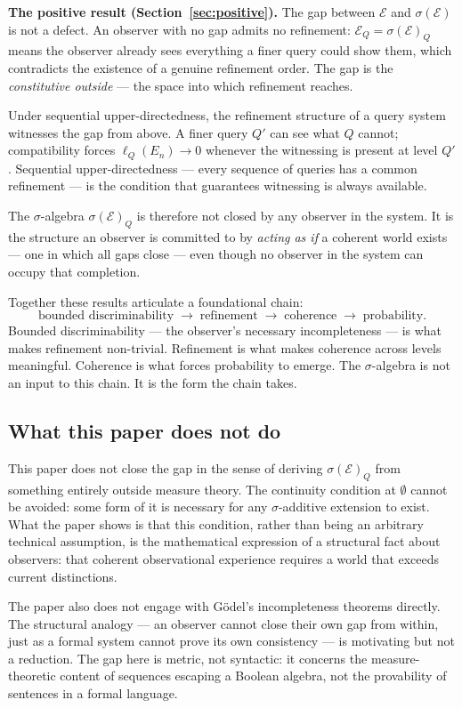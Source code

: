 \documentclass[12pt]{article}
\theoremstyle{definition}
\theoremstyle{remark}
\newcommand{\E}{\mathcal{E}}
\newcommand{\sigE}{\sigma(\mathcal{E})}
\begin{document}
\medskip
\noindent\textbf{The positive result (Section~\ref{sec:positive}).}
The gap between $\E$ and $\sigE$ is not a defect.  An observer with no gap admits no
refinement: $\E_Q = \sigE_Q$ means the observer already sees everything a finer query
could show them, which contradicts the existence of a genuine refinement order.  The
gap is the \emph{constitutive outside} --- the space into which refinement reaches.

Under sequential upper-directedness, the refinement structure of a query system
witnesses the gap from above.  A finer query $Q'$ can see what $Q$ cannot; compatibility
forces $\ell_Q(E_n) \to 0$ whenever the witnessing is present at level $Q'$.  Sequential
upper-directedness --- every sequence of queries has a common refinement --- is the
condition that guarantees witnessing is always available.

The $\sigma$-algebra $\sigE_Q$ is therefore not closed by any observer in the system.
It is the structure an observer is committed to by \emph{acting as if} a coherent world
exists --- one in which all gaps close --- even though no observer in the system can
occupy that completion.

\medskip
Together these results articulate a foundational chain:
\[
\text{bounded discriminability}
\;\to\;
\text{refinement}
\;\to\;
\text{coherence}
\;\to\;
\text{probability.}
\]
Bounded discriminability --- the observer's necessary incompleteness --- is what makes
refinement non-trivial.  Refinement is what makes coherence across levels meaningful.
Coherence is what forces probability to emerge.  The $\sigma$-algebra is not an input
to this chain.  It is the form the chain takes.

\subsection{What this paper does not do}

This paper does not close the gap in the sense of deriving $\sigE_Q$ from something
entirely outside measure theory.  The continuity condition at $\emptyset$ cannot be
avoided: some form of it is necessary for any $\sigma$-additive extension to exist.
What the paper shows is that this condition, rather than being an arbitrary technical
assumption, is the mathematical expression of a structural fact about observers: that
coherent observational experience requires a world that exceeds current distinctions.

The paper also does not engage with Gödel's incompleteness theorems directly.  The
structural analogy --- an observer cannot close their own gap from within, just as a
formal system cannot prove its own consistency --- is motivating but not a reduction.
The gap here is metric, not syntactic: it concerns the measure-theoretic content of
sequences escaping a Boolean algebra, not the provability of sentences in a formal
language.
\end{document}
